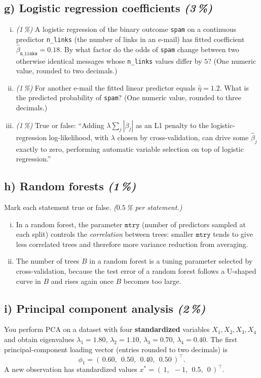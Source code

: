 \documentclass[11pt,a4paper]{article}
\newcommand{\subpoints}[1]{\textit{(#1\,\%)}}
\begin{document}
\subsection*{g) Logistic regression coefficients \subpoints{3}}
\begin{enumerate}[(i)]
  \item \subpoints{1} A logistic regression of the binary outcome \texttt{spam} on a continuous predictor \texttt{n\_links} (the number of links in an e-mail) has fitted coefficient $\hat\beta_{\texttt{n\_links}} = 0.18$. By what factor do the odds of \texttt{spam} change between two otherwise identical messages whose \texttt{n\_links} values differ by $5$? (One numeric value, rounded to two decimals.)
  \item \subpoints{1} For another e-mail the fitted linear predictor equals $\hat\eta = 1.2$. What is the predicted probability of \texttt{spam}? (One numeric value, rounded to three decimals.)
  \item \subpoints{1} True or false: ``Adding $\lambda \sum_j |\beta_j|$ as an L1 penalty to the logistic-regression log-likelihood, with $\lambda$ chosen by cross-validation, can drive some $\hat\beta_j$ exactly to zero, performing automatic variable selection on top of logistic regression.''
\end{enumerate}

\subsection*{h) Random forests \subpoints{1}}
Mark each statement true or false. \emph{($0.5$\,\% per statement.)}
\begin{enumerate}[(i)]
  \item In a random forest, the parameter $\mathtt{mtry}$ (number of predictors sampled at each split) controls the \emph{correlation} between trees: smaller $\mathtt{mtry}$ tends to give less correlated trees and therefore more variance reduction from averaging.
  \item The number of trees $B$ in a random forest is a tuning parameter selected by cross-validation, because the test error of a random forest follows a U-shaped curve in $B$ and rises again once $B$ becomes too large.
\end{enumerate}

\subsection*{i) Principal component analysis \subpoints{2}}
You perform PCA on a dataset with four \textbf{standardized} variables $X_1, X_2, X_3, X_4$ and obtain eigenvalues $\lambda_1 = 1.80$, $\lambda_2 = 1.10$, $\lambda_3 = 0.70$, $\lambda_4 = 0.40$. The first principal-component loading vector (entries rounded to two decimals) is
$$\phi_1 = (\,0.60,\;\,0.50,\;\,0.40,\;\,0.50\,)^\top.$$
A new observation has standardized values $x^* = (\,1,\;\, -1,\;\, 0.5,\;\, 0\,)^\top.$
\end{document}
